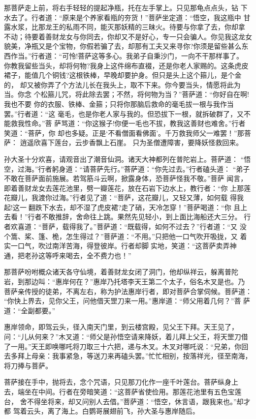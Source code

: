 那菩萨走上前，将右手轻轻的提起净瓶，托在左手掌上。只见那龟点点头，钻
下水去了。行者道：“原来是个养家看瓶的夯货！”菩萨坐定道：“悟空，我这瓶中
甘露水浆，比那龙王的私雨不同，能灭那妖精的三昧火。待要与你拿了去，你却拿
不动；待要着善财龙女与你同去，你却又不是好心，专一只会骗人。你见我这龙女
貌美，净瓶又是个宝物，你假若骗了去，却那有工夫又来寻你?你须是留些甚么东
西作当。”行者道：“可怜!菩萨这等多心。我弟子自秉沙门，一向不干那样事了。
你教我留些当头，却将何物?我身上这件绵布直裰，还是你老人家赐的。这条虎皮
裙子，能值几个铜钱?这根铁棒，早晚却要护身。但只是头上这个箍儿，是个金的，
却又被你弄了个方法儿长在我头上，取不下来。你今要当头，情愿将此为当。你念
个松箍儿咒，将此除去罢；不然，将何物为当？”菩萨道：“你好自在啊!我也不要
你的衣服、铁棒、金箍；只将你那脑后救命的毫毛拔一根与我作当罢。”行者道：“这
毫毛，也是你老人家与我的。但恐拔下一根，就拆破群了，又不能救我性命。”菩
萨骂道：“你这猴子!你便一毛也不拔，教我这善财也难舍。”行者笑道：“菩萨，你
却也多疑。正是‘不看僧面看佛面’。千万救我师父一难罢！”那菩萨：
逍遥欣喜下莲台，云步香飘上石崖。
只为圣僧遭障害，要降妖怪救回来。

孙大圣十分欢喜，请观音出了潮音仙洞。诸天大神都列在普陀岩上。菩萨道：
“悟空，过海。”行者躬身道：“请菩萨先行。”菩萨道：“你先过去。”行者磕头道：
“弟子不敢在菩萨面前施展。若驾筋斗云啊，掀露身体，恐菩萨怪我不敬。”菩萨
闻言，即着善财龙女去莲花池里，劈一瓣莲花，放在石岩下边水上，教行者：“你
上那莲花瓣儿，我渡你过海。”行者见了道：“菩萨，这花瓣儿，又轻又薄，如何载
得我起!这一翻跌下水去，却不湿了虎皮裙?走了硝，天冷怎穿！”菩萨喝道：“你
且上去看！”行者不敢推辞，舍命往上跳。果然先见轻小，到上面比海船还大三分。
行者欢喜道：“菩萨，载得我了。”菩萨道：“既载得，如何不过去？”行者道：“又
没个篙、桨、篷、桅，怎生得过？”菩萨道：“不用。”只把他一口气吹开吸拢，又
着实一口气，吹过南洋苦海，得登彼岸。行者却脚实地，笑道：“这菩萨卖弄神
通，把老孙这等呼来喝去，全不费力也！”

那菩萨吩咐概众诸天各守仙境，着善财龙女闭了洞门，他却纵祥云，躲离普陀
岩，到那边叫：“惠岸何在？”惠岸乃托塔李天王第二个太子，俗名木叉是也。乃
菩萨亲传授的徒弟，不离左右，称为护法惠岸行者，即对菩萨合掌伺候。菩萨道：
“你快上界去，见你父王，问他借天罡刀来一用。”惠岸道：“师父用着几何？”菩
萨道：“全副都要。”

惠岸领命，即驾云头，径入南天门里，到云楼宫殿，见父王下拜。天王见了，
问：“儿从何来？”木叉道：“师父是孙悟空请来降妖，着儿拜上父王，将天罡刀借
了一用。”天王即唤哪吒将刀取三十六把，递与木叉。木叉对哪吒说：“兄弟，你回
去多拜上母亲：我事紧急，等送刀来再磕头罢。”忙忙相别，按落祥光，径至南海，
将刀捧与菩萨。

菩萨接在手中，抛将去，念个咒语，只见那刀化作一座千叶莲台。菩萨纵身上
去，端坐在中间。行者在旁暗笑道：“这菩萨省使俭用。那莲花池里有五色宝莲台，
舍不得坐将来，却又问别人去借。”菩萨道：“悟空，休言语，跟我来也。”却才都
驾着云头，离了海上。白鹦哥展翅前飞，孙大圣与惠岸随后。

